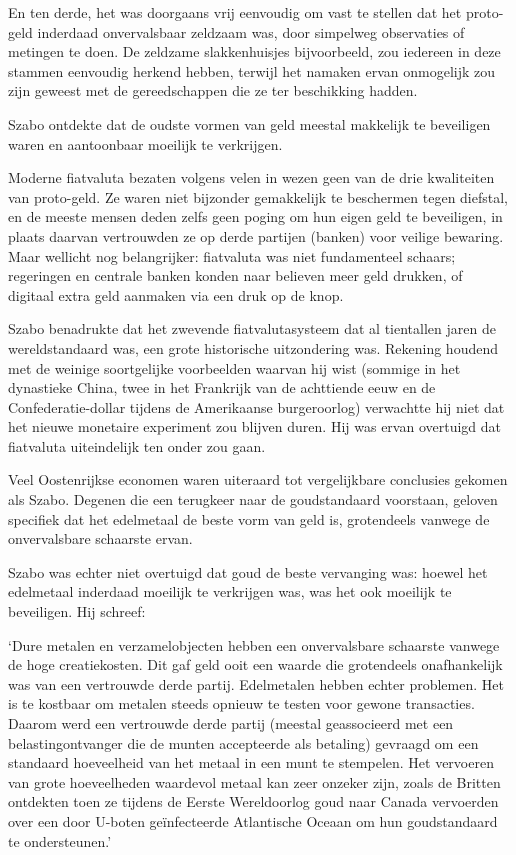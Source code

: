 \documentclass[
  a5paper,
  smalldemyvopaper,11pt,twoside,onecolumn,openright,extrafontsizes,
hidelinks]{memoir}
\renewenvironment{quote}%
               {\list{}{\rightmargin=.3cm\leftmargin=.3cm}%
                \itshape \item[]}%
               {\endlist}
\begin{document}
En ten derde, het was doorgaans vrij eenvoudig om vast te stellen dat
het proto-geld inderdaad onvervalsbaar zeldzaam was, door simpelweg
observaties of metingen te doen. De zeldzame slakkenhuisjes
bijvoorbeeld, zou iedereen in deze stammen eenvoudig herkend hebben,
terwijl het namaken ervan onmogelijk zou zijn geweest met de
gereedschappen die ze ter beschikking hadden.

Szabo ontdekte dat de oudste vormen van geld meestal makkelijk te
beveiligen waren en aantoonbaar moeilijk te verkrijgen.

Moderne fiatvaluta bezaten volgens velen in wezen geen van de drie
kwaliteiten van proto-geld. Ze waren niet bijzonder gemakkelijk te
beschermen tegen diefstal, en de meeste mensen deden zelfs geen poging
om hun eigen geld te beveiligen, in plaats daarvan vertrouwden ze op
derde partijen (banken) voor veilige bewaring. Maar wellicht nog
belangrijker: fiatvaluta was niet fundamenteel schaars; regeringen en
centrale banken konden naar believen meer geld drukken, of digitaal
extra geld aanmaken via een druk op de knop.

Szabo benadrukte dat het zwevende fiatvalutasysteem dat al tientallen
jaren de wereldstandaard was, een grote historische uitzondering was.
Rekening houdend met de weinige soortgelijke voorbeelden waarvan hij
wist (sommige in het dynastieke China, twee in het Frankrijk van de
achttiende eeuw en de Confederatie-dollar tijdens de Amerikaanse
burgeroorlog) verwachtte hij niet dat het nieuwe monetaire experiment
zou blijven duren. Hij was ervan overtuigd dat fiatvaluta uiteindelijk
ten onder zou gaan.

Veel Oostenrijkse economen waren uiteraard tot vergelijkbare conclusies
gekomen als Szabo. Degenen die een terugkeer naar de goudstandaard
voorstaan, geloven specifiek dat het edelmetaal de beste vorm van geld
is, grotendeels vanwege de onvervalsbare schaarste ervan.

Szabo was echter niet overtuigd dat goud de beste vervanging was: hoewel
het edelmetaal inderdaad moeilijk te verkrijgen was, was het ook
moeilijk te beveiligen. Hij schreef:

\begin{quote}
`Dure metalen en verzamelobjecten hebben een onvervalsbare schaarste
vanwege de hoge creatiekosten. Dit gaf geld ooit een waarde die
grotendeels onafhankelijk was van een vertrouwde derde partij.
Edelmetalen hebben echter problemen. Het is te kostbaar om metalen
steeds opnieuw te testen voor gewone transacties. Daarom werd een
vertrouwde derde partij (meestal geassocieerd met een belastingontvanger
die de munten accepteerde als betaling) gevraagd om een standaard
hoeveelheid van het metaal in een munt te stempelen. Het vervoeren van
grote hoeveelheden waardevol metaal kan zeer onzeker zijn, zoals de
Britten ontdekten toen ze tijdens de Eerste Wereldoorlog goud naar
Canada vervoerden over een door U-boten geïnfecteerde Atlantische Oceaan
om hun goudstandaard te ondersteunen.'
\end{quote}
\end{document}
